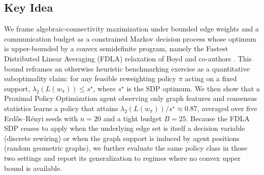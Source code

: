 %

\subsection*{Key Idea}
We frame algebraic-connectivity maximization under bounded edge weights
and a communication budget as a constrained Markov decision process whose
optimum is upper-bounded by a convex semidefinite program, namely the
Fastest Distributed Linear Averaging (FDLA) relaxation of Boyd and
co-authors \cite{XiaoBoyd2004,Boyd2006,GhoshBoyd2006}. This bound
reframes an otherwise heuristic benchmarking exercise as a quantitative
suboptimality claim: for any feasible reweighting policy $\pi$ acting on
a fixed support, $\lambda_2(L(w_\pi)) \le s^\star$, where $s^\star$ is
the SDP optimum. We then show that a Proximal Policy Optimization
\cite{Schulman2017} agent observing only graph features and consensus
statistics learns a policy that attains
$\lambda_2(L(w_\pi))/s^\star \approx 0.87$, averaged over five
Erd\H{o}s--R\'enyi seeds with $n = 20$ and a tight budget $B = 25$.
Because the FDLA SDP ceases to apply when the underlying edge set is
itself a decision variable (discrete rewiring) or when the graph support
is induced by agent positions (random geometric graphs), we further
evaluate the same policy class in those two settings and report its
generalization to regimes where no convex upper bound is available.
